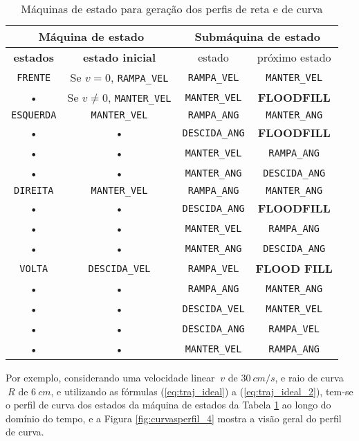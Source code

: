 \begin{table}[!htb]
	\centering
	\caption{\label{tab:maquina_estado1}Máquinas de estado para geração dos perfis de reta e de curva}
\begin{tabular}{c|c|c|c}
 \multicolumn{2}{c|}{\textbf{Máquina de estado}} & \multicolumn{2}{c}{\textbf{Submáquina de estado}} \\ 
 \hline 
 \textbf{estados} & \textbf{estado inicial} & estado & próximo estado \\ 
 \hline 
 \verb+FRENTE+ & Se $v = 0$, \verb+RAMPA_VEL+  & \verb+RAMPA_VEL+ & \verb+MANTER_VEL+ \\ 
 \hline 
 • & Se $v\neq0$, \verb+MANTER_VEL+ & \verb+MANTER_VEL+ & \textbf{FLOODFILL} \\ 
 \hline 
 \verb+ESQUERDA+ & \verb+MANTER_VEL+ & \verb+RAMPA_ANG+ & \verb+MANTER_ANG+ \\ 
 \hline 
 • & • & \verb+DESCIDA_ANG+ & \textbf{FLOODFILL} \\ 
 \hline 
 • & • & \verb+MANTER_VEL+ & \verb+RAMPA_ANG+ \\ 
 \hline 
 • & • & \verb+MANTER_ANG+ & \verb+DESCIDA_ANG+ \\ 
 \hline 
 \verb+DIREITA+ & \verb+MANTER_VEL+ & \verb+RAMPA_ANG+ & \verb+MANTER_ANG+ \\ 
 \hline 
 • & • & \verb+DESCIDA_ANG+ & \textbf{FLOODFILL} \\ 
 \hline 
 • & • & \verb+MANTER_VEL+ & \verb+RAMPA_ANG+ \\ 
 \hline 
 • & • & \verb+MANTER_ANG+ & \verb+DESCIDA_ANG+ \\ 
 \hline 
 \verb+VOLTA+ & \verb+DESCIDA_VEL+ & \verb+RAMPA_VEL+ & \textbf{FLOOD FILL} \\ 
 \hline 
 • & • & \verb+RAMPA_ANG+ & \verb+MANTER_ANG+ \\ 
 \hline 
 • & • & \verb+DESCIDA_VEL+ & \verb+MANTER_VEL+ \\ 
 \hline 
 • & • & \verb+DESCIDA_ANG+ & \verb+RAMPA_VEL+ \\ 
 \hline 
 • & • & \verb+MANTER_VEL+ & \verb+RAMPA_ANG+ \\ 
 \end{tabular}  
	
\end{table}


Por exemplo, considerando uma velocidade linear $~v$ de $30 ~cm/s$, e raio de curva $~R$ de $6 ~cm$, e utilizando as fórmulas (\ref{eq:traj_ideal}) a (\ref{eq:traj_ideal_2}), tem-se o perfil de curva dos estados da máquina de estados da Tabela \ref{tab:maquina_estado1} ao longo do domínio do tempo, e a Figura \ref{fig:curvasperfil_4} mostra a visão geral do perfil de curva.

